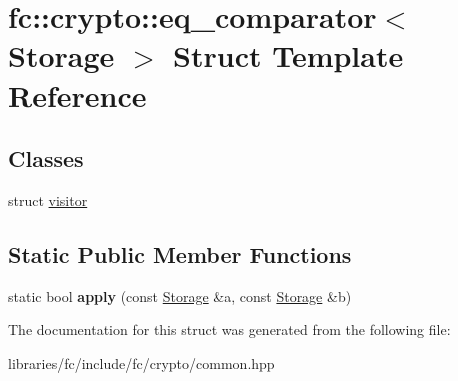 \hypertarget{structfc_1_1crypto_1_1eq__comparator}{}\section{fc\+:\+:crypto\+:\+:eq\+\_\+comparator$<$ Storage $>$ Struct Template Reference}
\label{structfc_1_1crypto_1_1eq__comparator}
\subsection*{Classes}
\begin{DoxyCompactItemize}
\item 
struct \mbox{\hyperlink{structfc_1_1crypto_1_1eq__comparator_1_1visitor}{visitor}}
\end{DoxyCompactItemize}
\subsection*{Static Public Member Functions}
\begin{DoxyCompactItemize}
\item 
\mbox{\label{structfc_1_1crypto_1_1eq__comparator_a4fa2491f52bac2b5a1bacbf2313b412c}} 
static bool {\bfseries apply} (const \mbox{\hyperlink{struct_storage}{Storage}} \&a, const \mbox{\hyperlink{struct_storage}{Storage}} \&b)
\end{DoxyCompactItemize}


The documentation for this struct was generated from the following file\+:\begin{DoxyCompactItemize}
\item 
libraries/fc/include/fc/crypto/common.\+hpp\end{DoxyCompactItemize}
